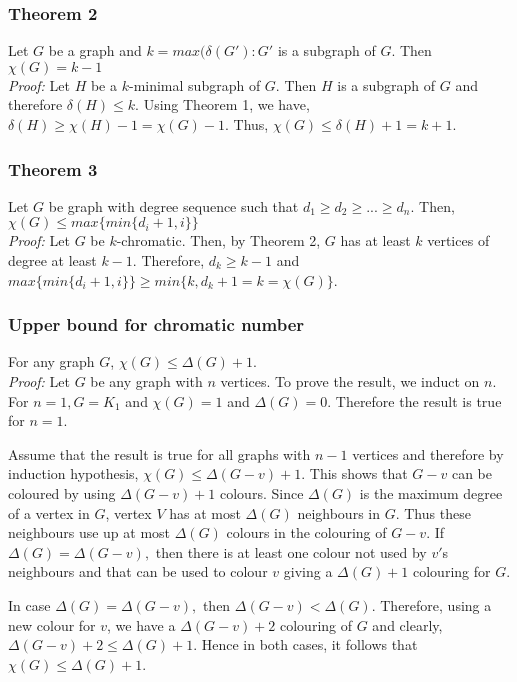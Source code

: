 \documentclass[a4paper,12pt]{article}
\begin{document}
\subsubsection{Theorem 2}
Let $G$ be a graph and $k = max(\delta(G\prime):G\prime$ is a subgraph of $G$. Then $\chi(G) = k-1$\\

\textit{Proof:}
Let $H$ be a $k$-minimal subgraph of $G$. Then $H$ is a subgraph of $G$ and therefore $\delta(H) \leq k$. Using Theorem 1, we have,$\delta(H)\geq\chi(H)-1 = \chi(G)-1$. Thus, $\chi(G) \leq \delta(H)+1 = k+1$.
\subsubsection{Theorem 3}
Let $G$ be graph with degree sequence such that $d_1\geq d_2\geq ... \geq d_n.$ Then, $\chi(G)\leq max \{min \{ d_i+1,i\}\}$\\

\textit{Proof:}
Let $G$ be $k$-chromatic. Then, by Theorem 2, $G$ has at least $k$ vertices of degree at least $k-1$. Therefore, $d_k\geq k-1$ and $max \{min \{ d_i+1,i\}\} \geq min\{k,d_k+1=k=\chi(G)\}$.
\subsubsection{Upper bound for chromatic number}
For any graph $G$, $\chi(G) \leq \Delta(G)+1$.\\

\textit{Proof:}
Let $G$ be any graph with $n$ vertices. To prove the result, we induct on $n$. For $n=1, G=K_1$ and $\chi(G) = 1$  and $\Delta(G) = 0$. Therefore the result is true for $n = 1$.

Assume that the result is true for all graphs with $n-1$ vertices and therefore by induction hypothesis, $\chi(G) \leq \Delta(G-v)+1$. This shows that $G-v$ can be coloured by using $\Delta(G-v) +1$ colours. Since $\Delta(G)$ is the maximum degree of a vertex in $G$, vertex $V$ has at most $\Delta(G)$ neighbours in $G$. Thus these neighbours use up at most $\Delta(G)$ colours in the colouring of $G-v$. If $\Delta(G) = \Delta(G-v),$ then there is at least one colour not used by $v'$s neighbours and that can be used to colour $v$ giving a $\Delta(G)+1$ colouring for $G$.

In case $\Delta(G)=\Delta (G-v),$ then $\Delta(G-v) < \Delta(G)$. Therefore, using a new colour for $v$,
we have a $\Delta(G-v)+2$ colouring of $G$ and clearly, $\Delta(G-v) +2 \leq \Delta(G) +1$. Hence in both cases, it follows that $\chi(G) \leq \Delta(G)+1$.
\newpage
\end{document}
